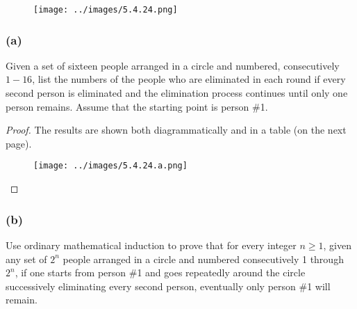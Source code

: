 \documentclass[14pt]{extarticle}
\begin{document}
\begin{figure}[ht!]
    \centering
    \texttt{[image: ../images/5.4.24.png]}
\end{figure}

\subsubsection{(a)}
Given a set of sixteen people arranged in a circle and numbered, consecutively $1-16$, list the numbers of the people who are eliminated in each round if every second person is eliminated and the elimination process continues
until only one person remains. Assume that the starting point is person \#1.

\begin{proof}
    The results are shown both diagrammatically and in a table (on the next page).

    \begin{figure}[ht!]
        \centering
        \texttt{[image: ../images/5.4.24.a.png]}
    \end{figure}
\end{proof}

\subsubsection{(b)}
Use ordinary mathematical induction to prove that for every integer $n \geq 1$, given any set of $2^n$ people arranged in a circle and numbered consecutively 1 through $2^n$, if one starts from person \#1 and goes repeatedly around the circle successively eliminating every second person, eventually only person \#1 will remain.
\end{document}
